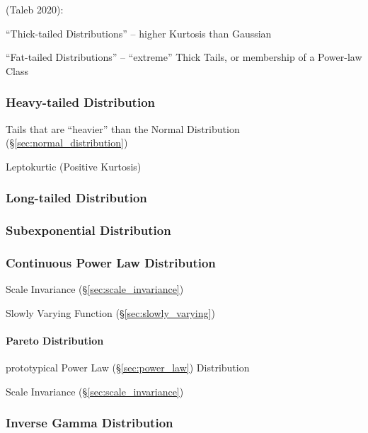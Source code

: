 (Taleb 2020):

``Thick-tailed Distributions'' -- higher Kurtosis than Gaussian

``Fat-tailed Distributions'' -- ``extreme'' Thick Tails, or membership of a
Power-law Class



\subsubsection{Heavy-tailed Distribution}\label{sec:heavy_tailed}

Tails that are ``heavier'' than the Normal Distribution
(\S\ref{sec:normal_distribution})

Leptokurtic (Positive Kurtosis)



\subsubsection{Long-tailed Distribution}\label{sec:long_tailed}

\subsubsection{Subexponential Distribution}
\label{sec:subexponential_distribution}

\subsubsection{Continuous Power Law Distribution}
\label{sec:continuous_power_law}

Scale Invariance (\S\ref{sec:scale_invariance})

Slowly Varying Function (\S\ref{sec:slowly_varying})



\paragraph{Pareto Distribution}\label{sec:pareto_distribution}\hfill

prototypical Power Law (\S\ref{sec:power_law}) Distribution

Scale Invariance (\S\ref{sec:scale_invariance})



\subsubsection{Inverse Gamma Distribution}\label{sec:inverse_gamma}

